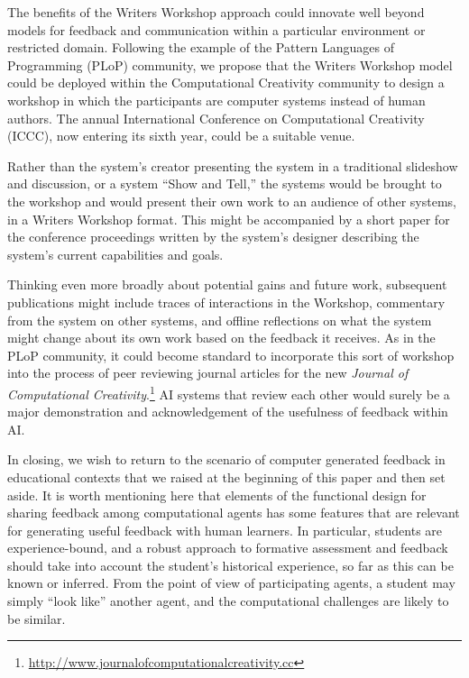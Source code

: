
The benefits of the Writers Workshop approach could innovate well beyond models for 
feedback and communication within a particular environment or restricted domain. 
Following the example of the Pattern Languages of Programming (PLoP) community, we propose that the Writers Workshop model could be deployed
within the Computational Creativity community to design a workshop in
which the participants are computer systems instead of human authors.
The annual International Conference on Computational Creativity
(ICCC), now entering its sixth year, could be a suitable venue. 

Rather than the system's creator presenting the system in a
traditional slideshow and discussion, or a system ``Show and Tell,''
the systems would be brought to the workshop and would present their
own work to an audience of other systems, in a Writers Workshop
format.  This might be accompanied by a short paper for the conference
proceedings written by the system's designer describing the system's
current capabilities and goals.  

Thinking even more broadly about potential gains and future work, subsequent publications might include
traces of interactions in the Workshop, commentary from the system on
other systems, and offline reflections on what the system might change
about its own work based on the feedback it receives.  As in the PLoP
community, it could become standard to incorporate this sort of workshop
into the process of peer reviewing journal articles for the new \emph{Journal of
  Computational Creativity}.\footnote{\url{http://www.journalofcomputationalcreativity.cc}} AI systems that review each other would surely be a major demonstration and acknowledgement of the usefulness of feedback within AI.

In closing, we wish to return to the scenario of computer generated
feedback in educational contexts that we raised at the beginning of
this paper and then set aside.  It is worth mentioning here that
elements of the functional design for sharing feedback among
computational agents has some features that are relevant for
generating useful feedback with human learners.  In particular,
students are experience-bound, and a robust approach to formative
assessment and feedback should take into account the student's historical experience, so far as
this can be known or inferred.  From the point of view of
participating agents, a student may simply ``look like'' another
agent, and the computational challenges are likely to be similar.
